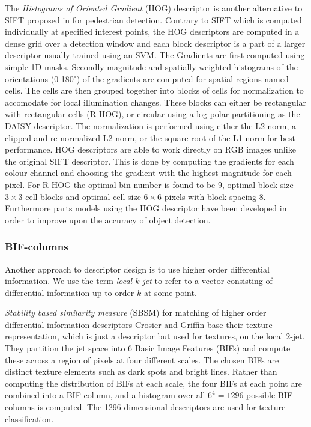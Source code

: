 \documentclass[thesis.tex]{subfiles}
\begin{document}
The \emph{Histograms of Oriented Gradient} (HOG) descriptor is another
alternative to SIFT proposed in \cite{dalal2005histograms} for pedestrian
detection. Contrary to SIFT which is computed individually at specified
interest points, the HOG descriptors are computed in a dense grid over a
detection window and each block descriptor is a part of a larger descriptor
usually trained using an SVM. The Gradients are first computed using simple
1D masks. Secondly magnitude and spatially weighted histograms of the
orientations (0-180$^{\circ}$) of the gradients are computed for spatial
regions named cells. The cells are
then grouped together into blocks of cells for normalization to accomodate
for local illumination changes. These blocks can either be rectangular with
rectangular cells (R-HOG), or circular using a log-polar partitioning as the
DAISY descriptor. The normalization is performed using either the L2-norm,
a clipped and re-normalized L2-norm, or the square root of the L1-norm for
best performance. HOG descriptors are able to work directly on RGB images
unlike the original SIFT descriptor. This is done by computing the gradients
for each colour channel and choosing the gradient with the highest magnitude
for each pixel. For R-HOG the optimal bin number is found to be 9, optimal
block size $3\times3$ cell blocks and optimal cell size $6\times6$ pixels
with block spacing 8.
Furthermore parts models using the HOG descriptor have been developed
\cite{felzenszwalb2008discriminatively} in order to improve upon the accuracy
of object detection.

\subsubsection{BIF-columns}

Another approach to descriptor design is to use higher order differential
information.
We use the term \emph{local $k$-jet} to refer to a vector
consisting of differential information up to order $k$ at some point.

\emph{Stability based similarity measure} (SBSM) \cite{balmashnova2008novel} for
matching of higher order differential information descriptors
Crosier and Griffin \cite{crosier2010using} base their texture representation, which
is just a descriptor but used for textures, on the local $2$-jet. They
partition the jet space into 6 Basic Image Features (BIFs) and compute these
across a region of pixels at four different scales. The chosen BIFs are
distinct texture elements such as dark spots and bright lines. Rather than
computing the distribution of BIFs at each scale, the four BIFs at each point
are combined into a BIF-column, and a histogram over all $6^4 = 1296$ possible
BIF-columns is computed. The 1296-dimensional descriptors are used for texture
classification.
\end{document}
